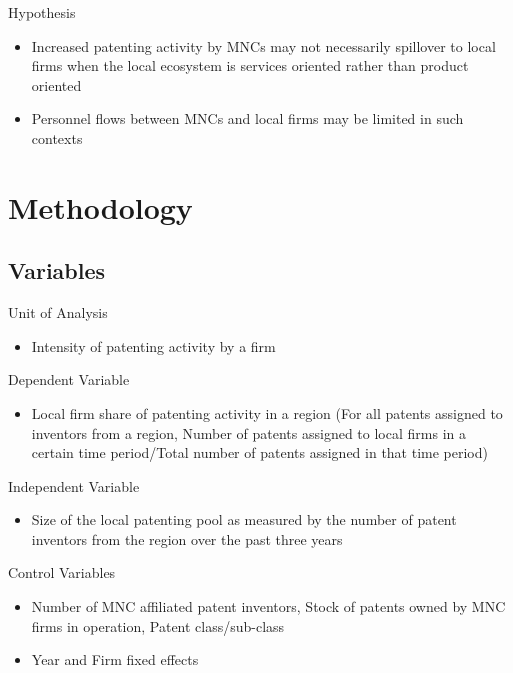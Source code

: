 \documentclass{beamer}
\begin{document}
\begin{frame}{Hypothesis}{}
\begin{itemize}
\item<1->{Increased patenting activity by MNCs may not necessarily spillover to local firms when the local ecosystem is services oriented rather than product oriented}
\item<2->{Personnel flows between MNCs and local firms may be limited in such contexts}
\end{itemize}
\end{frame}

\section{Methodology}
\subsection{Variables}
\begin{frame}{Unit of Analysis}{}
\begin{itemize}
\item<1->{Intensity of patenting activity by a firm}
\end{itemize}
\end{frame}

\begin{frame}{Dependent Variable}{}
\begin{itemize}
\item<1->{Local firm share of patenting activity in a region (For all patents assigned to inventors from a region, Number of patents assigned to local firms in a certain time period/Total number of patents assigned in that time period)}
\end{itemize}
\end{frame}

\begin{frame}{Independent Variable}{}
\begin{itemize}
\item<1->{Size of the local patenting pool as measured by the number of patent inventors from the region over the past three years}
\end{itemize}
\end{frame}

\begin{frame}{Control Variables}{}
\begin{itemize}
\item<1->{Number of MNC affiliated patent inventors, Stock of patents owned by MNC firms in operation, Patent class/sub-class}
\item<2->{Year and Firm fixed effects}
\end{itemize}
\end{frame}
\end{document}
